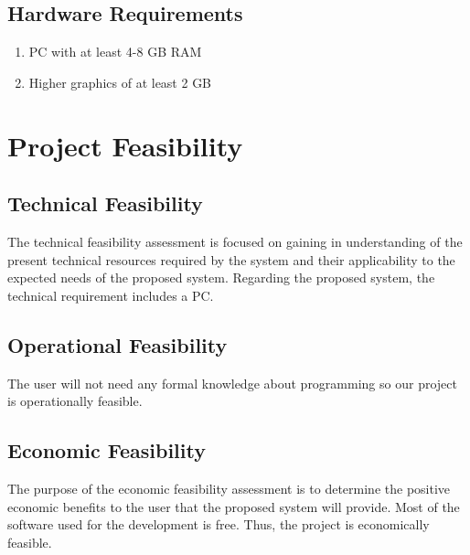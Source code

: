 \subsection{Hardware Requirements}
\vspace{-10pt}
\begin{enumerate}
\item[] PC with at least 4-8 GB RAM
\item[] Higher graphics of at least 2 GB
\end{enumerate}
\label{tblSampleTable}

\section{Project Feasibility}
\vspace{-18pt}
\subsection{Technical Feasibility}
\vspace{-18pt}
The technical feasibility assessment is focused on gaining in understanding of the present technical resources required by the system and their applicability to the expected needs of the proposed system. Regarding the proposed system, the technical requirement includes a PC.
\vspace{-18pt}
\subsection{Operational Feasibility}
\vspace{-18pt}
The user will not need any formal knowledge about programming so our project is operationally feasible.
\vspace{-18pt}
\subsection{Economic Feasibility}
\vspace{-18pt}
The purpose of the economic feasibility assessment is to determine the positive economic benefits to the user that the proposed system will provide. Most of the software used for the development is free. Thus, the project is economically feasible.
\vspace{-18pt}
